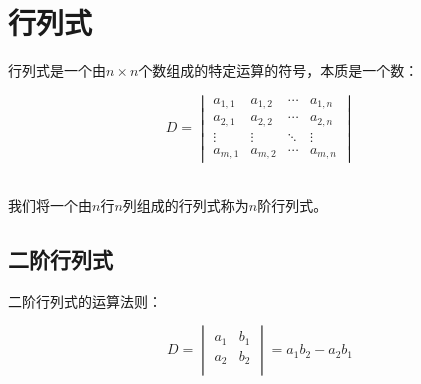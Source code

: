 \documentclass[UTF8]{ctexart}
\begin{document}
\newpage

\section{行列式}
    行列式是一个由$n\times n$个数组成的特定运算的符号，本质是一个数：
    \begin{large}
        \begin{equation*}
            D=
            \begin{vmatrix}
                a_{1,1}&a_{1,2}&\cdots&a_{1,n}\\
                a_{2,1}&a_{2,2}&\cdots&a_{2,n}\\
                \vdots&\vdots&\ddots&\vdots\\
                a_{m,1}&a_{m,2}&\cdots&a_{m,n}
            \end{vmatrix}
        \end{equation*}
    \end{large}\\
    我们将一个由$n$行$n$列组成的行列式称为$n$阶行列式。

\subsection{二阶行列式}
    二阶行列式的运算法则：
    \begin{large}
        \begin{equation*}
            D=
            \begin{vmatrix}
                a_1&b_1\\
                a_2&b_2\\
            \end{vmatrix}
            =a_1b_2-a_2b_1
        \end{equation*}
    \end{large}
\end{document}
